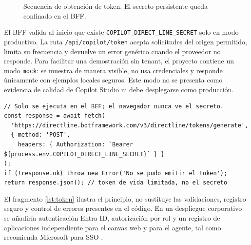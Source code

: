 \begin{figure}[H]
\centering
{}
\caption{Secuencia de obtenci\'on de token. El secreto persistente queda confinado en el BFF.}
\label{fig:secuencia-token}
\end{figure}

El BFF valida al inicio que existe \texttt{COPILOT\_DIRECT\_LINE\_SECRET} solo en modo productivo. La ruta \texttt{/api/copilot/token} acepta solicitudes del origen permitido, limita su frecuencia y devuelve un error gen\'erico cuando el proveedor no responde. Para facilitar una demostraci\'on sin tenant, el proyecto contiene un modo \texttt{mock}: se muestra de manera visible, no usa credenciales y responde \`unicamente con ejemplos locales seguros. Este modo no se presenta como evidencia de calidad de Copilot Studio ni debe desplegarse como producci\'on.

\begin{lstlisting}[caption={Patr\'on simplificado de canje de secreto en el servidor.},label={lst:token}]
// Solo se ejecuta en el BFF; el navegador nunca ve el secreto.
const response = await fetch(
  'https://directline.botframework.com/v3/directline/tokens/generate',
  { method: 'POST',
    headers: { Authorization: `Bearer ${process.env.COPILOT_DIRECT_LINE_SECRET}` } }
);
if (!response.ok) throw new Error('No se pudo emitir el token');
return response.json(); // token de vida limitada, no el secreto
\end{lstlisting}

El fragmento \ref{lst:token} ilustra el principio, no sustituye las validaciones, registro seguro y control de errores presentes en el c\'odigo. En un despliegue corporativo se a\~nadir\'ia autenticaci\'on Entra ID, autorizaci\'on por rol y un registro de aplicaciones independiente para el canvas web y para el agente, tal como recomienda Microsoft para SSO \cite{copilotSso}.

